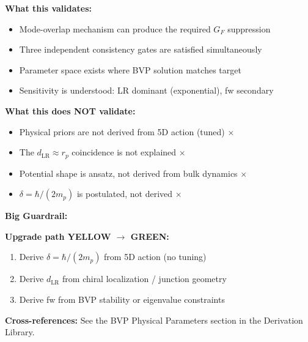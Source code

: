 \begin{tcolorbox}[colback=yellow!10!white, colframe=yellow!70!black,
    title={\textbf{Epistemic Status: Framework GREEN, Values YELLOW}}]

\textbf{What this validates:}
\begin{itemize}[nosep]
    \item Mode-overlap mechanism can produce the required $G_F$ suppression \checkmark
    \item Three independent consistency gates are satisfied simultaneously \checkmark
    \item Parameter space exists where BVP solution matches target \checkmark
    \item Sensitivity is understood: LR dominant (exponential), fw secondary \checkmark
\end{itemize}

\textbf{What this does NOT validate:}
\begin{itemize}[nosep]
    \item Physical priors are not derived from 5D action (tuned) $\times$
    \item The $d_{\text{LR}} \approx r_p$ coincidence is not explained $\times$
    \item Potential shape is ansatz, not derived from bulk dynamics $\times$
    \item $\delta = \hbar/(2m_p)$ is postulated, not derived $\times$
\end{itemize}

\vspace{0.5em}
\textbf{Big Guardrail:}
\begin{center}
\end{center}

\vspace{0.5em}
\textbf{Upgrade path YELLOW $\to$ GREEN:}
\begin{enumerate}[nosep]
    \item Derive $\delta = \hbar/(2m_p)$ from 5D action (no tuning)
    \item Derive $d_{\text{LR}}$ from chiral localization / junction geometry
    \item Derive fw from BVP stability or eigenvalue constraints
\end{enumerate}

\textbf{Cross-references:} See the BVP Physical Parameters section in the Derivation Library.

\end{tcolorbox}

